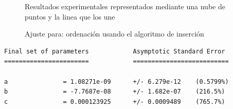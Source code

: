 
\begin{figure}[H]%
    \centering
    \caption{Resultados experimentales representados mediante una nube de puntos y la linea que los une}%
    \centering
    \caption{Ajuste para: ordenación usando el algoritmo de inserción}%
\end{figure}

\begin{verbatim}
Final set of parameters            Asymptotic Standard Error
=======================            ==========================

a               = 1.08271e-09      +/- 6.279e-12    (0.5799%)
b               = -7.7687e-08      +/- 1.682e-07    (216.5%)
c               = 0.000123925      +/- 0.0009489    (765.7%)


\end{verbatim}
